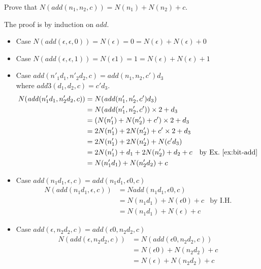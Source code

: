 \documentclass{tufte-handout}
\newcommand{\BR}[1]{(#1)}
\begin{document}
\begin{Exercise}
  \label{ex:add}
  Prove that $N(\mathit{add}(n_1,n_2,c)) = N(n_1) + N(n_2) + c$.
\end{Exercise}
\begin{Answer}
The proof is by induction on $\mathit{add}$.
\begin{itemize}
\item Case $N(\mathit{add}(\epsilon, \epsilon, 0)) = N\BR{\epsilon} = 0
       = N\BR{ \epsilon} + N\BR{ \epsilon} + 0$
\item Case $N(\mathit{add}(\epsilon, \epsilon, 1)) = N\BR{\epsilon 1} = 1
       = N\BR{\epsilon} + N\BR{\epsilon} + 1$
\item Case $\mathit{add}(n'_1 d_1 , n'_2  d_2, c) 
    = \mathit{add}(n_1, n_2, c')d_3$ \\
  where $\mathit{add3}(d_1, d_2, c) = c'd_3$. 
    \begin{align*}
    N(\mathit{add}(n'_1 d_1 , n'_2  d_2, c)) 
      &= N(\mathit{add}(n'_1, n'_2, c')d_3) \\
      &= N(\mathit{add}(n'_1, n'_2, c')) \times 2 + d_3 \\
      &= (N(n'_1) + N(n'_2) + c') \times 2 + d_3\\
      &= 2 N(n'_1) + 2 N(n'_2) + c' \times 2 + d_3 \\
      &= 2 N(n'_1) + 2 N(n'_2) + N\BR{c' d_3} \\
      &= 2 N(n'_1) +  d_1 + 2 N(n'_2) +  d_2 + c 
         & \text{by Ex.~\ref{ex:bit-add}}\\
      &= N \BR{n'_1 d_1} + N \BR{n'_2 d_2} + c
    \end{align*}

\item Case $\mathit{add}(n_1 d_1 , \epsilon, c) = 
  \mathit{add}(n_1 d_1 , \epsilon 0, c)$
  \begin{align*}
    N(\mathit{add}(n_1 d_1 , \epsilon, c))
    & = N\mathit{add}(n_1 d_1 , \epsilon 0, c) \\
    & = N \BR{n_1d_1} + N \BR{\epsilon 0} + c & \text{by I.H.}\\
    & = N \BR{n_1 d_1} + N\BR{\epsilon} + c
  \end{align*}

\item Case $\mathit{add}(\epsilon, n_2 d_2, c) = 
  \mathit{add}( \epsilon 0, n_2 d_2,c)$
  \begin{align*}
    N(\mathit{add}(\epsilon, n_2 d_2, c))
    &= N(\mathit{add}( \epsilon 0, n_2 d_2,c)) \\
    &= N\BR{\epsilon 0} + N\BR{n_2 d_2} + c \\
    &= N\BR{\epsilon} + N\BR{n_2 d_2} + c
  \end{align*}

\end{itemize}
\end{Answer}
\end{document}
